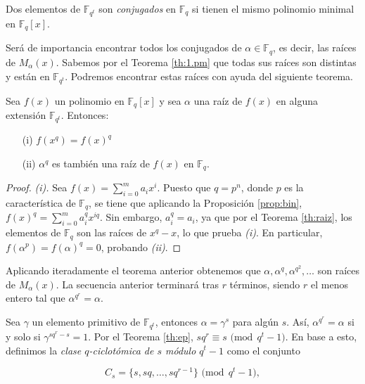     \begin{definicion}
    Dos elementos de $\mathbb{F}_{q^t}$ son \emph{conjugados} en $\mathbb{F}_{q}$ si tienen el mismo polinomio minimal en $\mathbb{F}_{q}[x]$.
    \end{definicion}

    Será de importancia encontrar todos los conjugados de $\alpha \in \mathbb{F}_q$, es decir, las raíces de $M_\alpha(x)$. Sabemos por el Teorema \ref{th:1.pm} que todas sus raíces son distintas y están en $\mathbb{F}_{q^t}$. Podremos encontrar estas raíces con ayuda del siguiente teorema.

    \begin{teorema}
        Sea $f(x)$ un polinomio en $\mathbb{F}_q[x]$ y sea $\alpha$ una raíz de $f(x)$ en alguna extensión $\mathbb{F}_{q^t}$. Entonces:
        \begin{itemize}
            \item[(i)] $f(x^q) = f(x)^q$
            \item[(ii)] $\alpha^q$ es también una raíz de $f(x)$ en $\mathbb{F}_q$.
        \end{itemize} 
        
    \end{teorema}

    \begin{proof}
        \textit{(i). } Sea $f(x) = \sum_{i=0}^{m}a_ix^i$. Puesto que $q = p^n$, donde $p$ es la característica de $\mathbb{F}_q$, se tiene que aplicando la Proposición \ref{prop:bin}, $f(x)^q = \sum_{i=0}^{m}a_i^qx^{iq}$. Sin embargo, $a_i^q = a_i$, ya que por el Teorema \ref{th:raiz}, los elementos de $\mathbb{F}_q$ son las raíces de $x^q - x$, lo que prueba \textit{(i)}. En particular, $f(\alpha^p) = f(\alpha)^q = 0$, probando \textit{(ii)}.
    \end{proof}

 Aplicando iteradamente el teorema anterior obtenemos que $\alpha,\alpha^q,\alpha^{q^2},\dots$ son raíces de $M_\alpha(x)$. La secuencia anterior terminará tras $r$ términos, siendo $r$ el menos entero tal que $\alpha^{q^r} = \alpha$.

 Sea $\gamma$ un elemento primitivo de $\mathbb{F}_{q^t}$, entonces $\alpha = \gamma^s$ para algún $s$. Así, $\alpha^{q^r} = \alpha$ si y solo si $\gamma^{sq^r - s} = 1$. Por el Teorema \ref{th:ep}, $sq^r \equiv s \text{  (mod} \ \ q^t - 1)$. En base a esto, definimos la \emph{clase $q$-ciclotómica de $s$ módulo $q^t - 1$} como el conjunto

 $$C_s = \{s,sq,\dots,sq^{r-1}\} \text{  (mod} \ \ q^t - 1),$$

